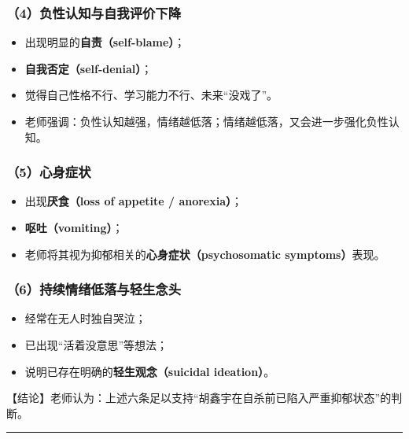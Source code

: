 \documentclass[
  chinese,
  9pt,
  a4paper,
]{ctexart}
\providecommand{\tightlist}{%
  \setlength{\itemsep}{0pt}\setlength{\parskip}{0pt}}
\begin{document}
\subsubsection{（4）负性认知与自我评价下降}\label{ux8d1fux6027ux8ba4ux77e5ux4e0eux81eaux6211ux8bc4ux4ef7ux4e0bux964d}

\begin{itemize}
\tightlist
\item
  出现明显的\textbf{自责（self-blame）}；
\item
  \textbf{自我否定（self-denial）}；
\item
  觉得自己性格不行、学习能力不行、未来``没戏了''。
\item
  老师强调：负性认知越强，情绪越低落；情绪越低落，又会进一步强化负性认知。
\end{itemize}

\subsubsection{（5）心身症状}\label{ux5fc3ux8eabux75c7ux72b6}

\begin{itemize}
\tightlist
\item
  出现\textbf{厌食（loss of appetite / anorexia）}；
\item
  \textbf{呕吐（vomiting）}；
\item
  老师将其视为抑郁相关的\textbf{心身症状（psychosomatic
  symptoms）}表现。
\end{itemize}

\subsubsection{（6）持续情绪低落与轻生念头}\label{ux6301ux7eedux60c5ux7eeaux4f4eux843dux4e0eux8f7bux751fux5ff5ux5934}

\begin{itemize}
\tightlist
\item
  经常在无人时独自哭泣；
\item
  已出现``活着没意思''等想法；
\item
  说明已存在明确的\textbf{轻生观念（suicidal ideation）}。
\end{itemize}

【结论】老师认为：上述六条足以支持``胡鑫宇在自杀前已陷入严重抑郁状态''的判断。

\begin{center}\rule{0.5\linewidth}{0.5pt}\end{center}
\end{document}
